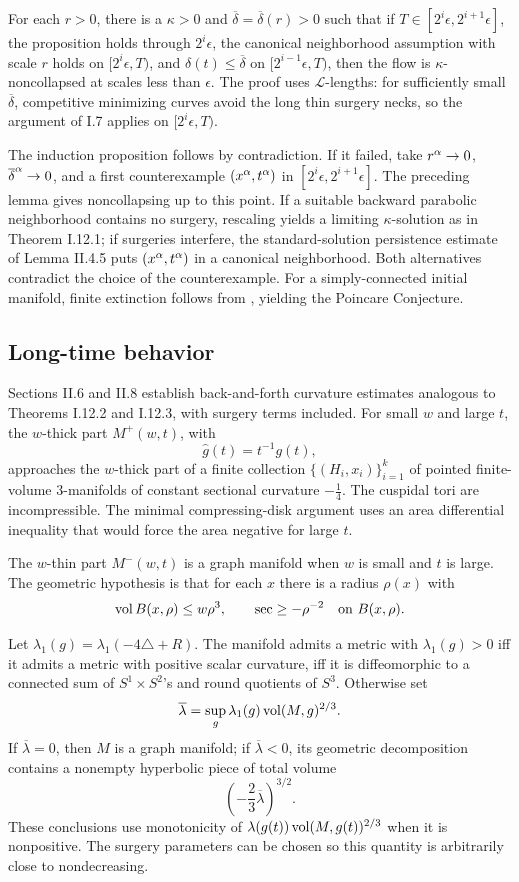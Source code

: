 For each $r>0$, there is a $\kappa>0$ and
$\overline\delta=\overline\delta(r)>0$ such that if
$T\in[2^i\epsilon,2^{i+1}\epsilon]$, the proposition holds through
$2^i\epsilon$, the canonical neighborhood assumption with scale $r$ holds
on $[2^i\epsilon,T)$, and $\delta(t)\le\overline\delta$ on
$[2^{i-1}\epsilon,T)$, then the flow is $\kappa$-noncollapsed at scales less
than $\epsilon$. The proof uses ${\mathcal L}$-lengths: for sufficiently
small $\overline\delta$, competitive minimizing curves avoid the long thin
surgery necks, so the argument of I.7 applies on $[2^i\epsilon,T)$.

The induction proposition follows by contradiction. If it failed, take
$r^\alpha\to0$, $\overline\delta^\alpha\to0$, and a first counterexample
$(x^\alpha,t^\alpha)$ in $[2^i\epsilon,2^{i+1}\epsilon]$. The preceding lemma gives
noncollapsing up to this point. If a suitable backward parabolic neighborhood
contains no surgery, rescaling yields a limiting $\kappa$-solution as in
Theorem I.12.1; if surgeries interfere, the standard-solution persistence
estimate of Lemma II.4.5 puts $(x^\alpha,t^\alpha)$ in a canonical neighborhood.
Both alternatives contradict the choice of the counterexample. For a
simply-connected initial manifold, finite extinction follows from
\cite{Colding-Minicozzi,Colding-Minicozzi2,Perelman3}, yielding the
Poincare Conjecture.

\subsection{Long-time behavior}

Sections II.6 and II.8 establish back-and-forth curvature estimates analogous
to Theorems I.12.2 and I.12.3, with surgery terms included. For small $w$ and
large $t$, the $w$-thick part $M^+(w,t)$, with
\[
\widehat g(t)=t^{-1}g(t),
\]
approaches the $w$-thick part of a finite collection
$\{(H_i,x_i)\}_{i=1}^k$ of pointed finite-volume $3$-manifolds of constant
sectional curvature $-\frac14$. The cuspidal tori are incompressible. The
minimal compressing-disk argument uses an area differential inequality that
would force the area negative for large $t$.

The $w$-thin part $M^-(w,t)$ is a graph manifold when $w$ is small and $t$ is
large. The geometric hypothesis is that for each $x$ there is a radius
$\rho(x)$ with
\[
\operatorname{vol} B(x,\rho)\le w\rho^3,
\qquad
\sec\ge-\rho^{-2}\quad\text{on }B(x,\rho).
\]

Let $\lambda_1(g)=\lambda_1(-4\triangle+R)$. The manifold admits a metric
with $\lambda_1(g)>0$ iff it admits a metric with positive scalar curvature,
iff it is diffeomorphic to a connected sum of $S^1\times S^2$'s and round
quotients of $S^3$. Otherwise set
\[
\overline\lambda=\sup_g\lambda_1(g)\operatorname{vol}(M,g)^{2/3}.
\]
If $\overline\lambda=0$, then $M$ is a graph manifold; if
$\overline\lambda<0$, its geometric decomposition contains a nonempty
hyperbolic piece of total volume
\[
\left(-\frac23\overline\lambda\right)^{3/2}.
\]
These conclusions use monotonicity of
$\lambda(g(t))\operatorname{vol}(M,g(t))^{2/3}$ when it is nonpositive. The surgery
parameters can be chosen so this quantity is arbitrarily close to
nondecreasing.

